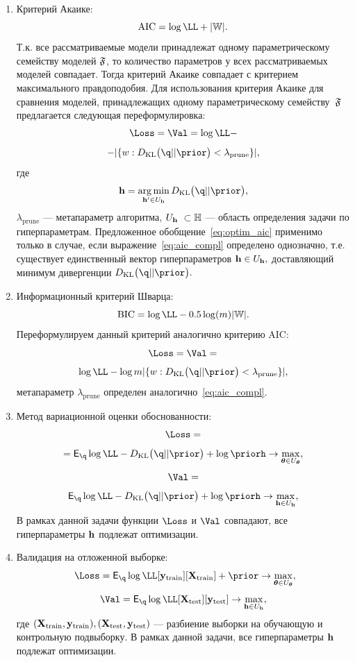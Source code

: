 \begin{enumerate}
\item Критерий Акаике:
\[
   \text{AIC} =  \log \LL + |\Wb|.
\]
Т.к. все рассматриваемые модели принадлежат одному параметрическому семейству моделей $\mathfrak{F}$, то количество параметров у всех рассматриваемых моделей  совпадает. Тогда критерий Акаике совпадает с критерием максимального правдоподобия. Для использования критерия Акаике для сравнения моделей, принадлежащих одному параметрическому семейству~$\mathfrak{F}$ предлагается следующая переформулировка:
\begin{equation}
\label{eq:optim_aic}
    \Loss = \Val = \log \LL - 
\end{equation}
\[
 - |\{w: \KL{\q}{\prior}<\lambda_\text{prune}\}|,
\]
где 
\begin{equation}\label{eq:aic_compl}\h=\argmin_{\h' \in \Uh} \KL{\q}{\prior},\end{equation} $\lambda_{\text{prune}}$ --- метапараметр алгоритма, $\Uh  \subset \Hb$ --- область определения задачи по гиперпараметрам. Предложенное обобщение~\eqref{eq:optim_aic} применимо только в случае, если выражение~\eqref{eq:aic_compl} определено однозначно, т.е. существует единственный вектор гиперпараметров  $\mathbf{h} \in U_{\mathbf{h}},$ доставляющий минимум дивергенции $\KL{\q}{\prior}.$

\item Информационный критерий Шварца:
\[
    \text{BIC} = \log \LL -0.5\log(m)|\Wb|.
\]
Переформулируем данный критерий аналогично критерию AIC:
\begin{equation}
\label{eq:optim_bic}
    \Loss = \Val =  
\end{equation}
\[
\log \LL - \log m |\{w: \KL{\q}{\prior}<\lambda_{\text{prune}}\}|,
\]
метапараметр $\lambda_{\text{prune}}$ определен аналогично~\eqref{eq:aic_compl}.

\item Метод вариационной оценки обоснованности:
\begin{equation}
\label{eq:optim_elbo_method}   
    \Loss = 
\end{equation}
\[
= \E_{\q} \log \LL - \KL{\q}{\prior} + \log\priorh \to \max_{\teta \in \Uteta},
\]
\[
     \Val = 
\]
\[
\E_{\q} \log \LL - \KL{\q}{\prior} + \log\priorh \to \max_{\h \in \Uh},
\]
В рамках данной задачи функции $\Loss$ и $\Val$ совпадают, все гиперпараметры $\mathbf{h}$ подлежат оптимизации.

\item Валидация на отложенной выборке:
\begin{equation}
\label{eq:optim_hold_out}
    \Loss = \E_{\q} \log \LL[\y_\text{train}][\X_\text{train}] + \prior \to \max_{\teta \in \Uteta},
\end{equation}
\[
    \Val = \E_{\q} \log \LL[\X_\text{test}][\y_\text{test}] \to \max_{\h \in \Uh},
\]
где $(\mathbf{X}_\text{train}, \mathbf{y}_\text{train}), (\mathbf{X}_\text{test}, \mathbf{y}_\text{test})$ --- разбиение выборки на обучающую и контрольную подвыборку.
В рамках данной задачи, все гиперпараметры $\mathbf{h}$ подлежат оптимизации.

\end{enumerate}

